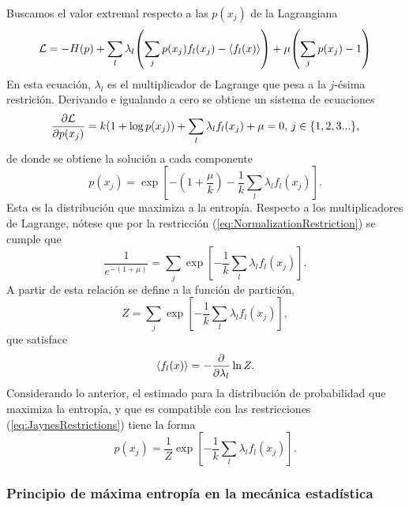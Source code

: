 Buscamos el valor extremal respecto a las $p(x_{j})$ de la Lagrangiana
\begin{equation}
    \mathcal{L}=-H(p)+\sum_{l}\lambda_{l}\qty(\sum_{j}p(x_{j})f_{l}(x_{j})-\expval{f_{l}(x)})+\mu\qty(\sum_{j}p(x_{j})-1)\nonumber
\end{equation}
En esta ecuación, $\lambda_{l}$ es el multiplicador de Lagrange que pesa a la $j$-ésima restrición. Derivando e igualando a cero se obtiene un sistema de ecuaciones
\begin{equation}
    \frac{\partial \mathcal{L}}{\partial p(x_{j})}=k(1+\log{p(x_{j})})+\sum_{l}\lambda_{l}f_{l}(x_{j})+\mu=0,\, j\in\{1,2,3...\},\nonumber
\end{equation}
de donde se obtiene la solución a cada componente
\begin{equation}
    p(x_{j})=\exp[-(1+\frac{\mu}{k})-\frac{1}{k}\sum_{l}\lambda_{l}f_{l}(x_{j})].\nonumber
\end{equation}
Esta es la distribución que maximiza a la entropía. Respecto a los multiplicadores de Lagrange, nótese que por la restricción (\ref{eq:NormalizationRestriction}) se cumple que
\begin{equation}
    \frac{1}{e^{-(1+\mu)}}=\sum_{j}\exp[-\frac{1}{k}\sum_{l}\lambda_{l}f_{l}(x_{j})].\nonumber
\end{equation}
A partir de esta relación se define a la función de partición,
\begin{equation}
    Z=\sum_{j}\exp[-\frac{1}{k}\sum_{l}\lambda_{l}f_{l}(x_{j})],\nonumber
\end{equation}
que satisface
\begin{equation}
    \expval{f_{l}(x)}=-\frac{\partial}{\partial \lambda_{l}}\ln{Z}.\nonumber
\end{equation}
Considerando lo anterior, el estimado para la distribución de probabilidad que maximiza la entropía, y que es compatible con las restricciones (\ref{eq:JaynesRestrictions}) tiene la forma 
\begin{equation}\label{eq:MaxEntDist}
    p(x_{j})=\frac{1}{Z}\exp[-\frac{1}{k}\sum_{l}\lambda_{l}f_{l}(x_{j})].
\end{equation}

\subsubsection{Principio de máxima entropía en la mecánica estadística}

